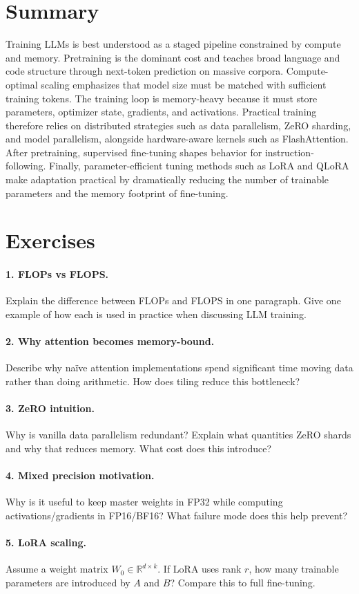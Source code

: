 \section{Summary}
Training LLMs is best understood as a staged pipeline constrained by compute and memory. Pretraining is the dominant cost and teaches broad language and code structure through next-token prediction on massive corpora. Compute-optimal scaling emphasizes that model size must be matched with sufficient training tokens. The training loop is memory-heavy because it must store parameters, optimizer state, gradients, and activations. Practical training therefore relies on distributed strategies such as data parallelism, ZeRO sharding, and model parallelism, alongside hardware-aware kernels such as FlashAttention. After pretraining, supervised fine-tuning shapes behavior for instruction-following. Finally, parameter-efficient tuning methods such as LoRA and QLoRA make adaptation practical by dramatically reducing the number of trainable parameters and the memory footprint of fine-tuning.

\section{Exercises}
\paragraph{1. FLOPs vs FLOPS.}
Explain the difference between FLOPs and FLOPS in one paragraph. Give one example of how each is used in practice when discussing LLM training.

\paragraph{2. Why attention becomes memory-bound.}
Describe why naïve attention implementations spend significant time moving data rather than doing arithmetic. How does tiling reduce this bottleneck?

\paragraph{3. ZeRO intuition.}
Why is vanilla data parallelism redundant? Explain what quantities ZeRO shards and why that reduces memory. What cost does this introduce?

\paragraph{4. Mixed precision motivation.}
Why is it useful to keep master weights in FP32 while computing activations/gradients in FP16/BF16? What failure mode does this help prevent?

\paragraph{5. LoRA scaling.}
Assume a weight matrix \(W_0 \in \mathbb{R}^{d\times k}\). If LoRA uses rank \(r\), how many trainable parameters are introduced by \(A\) and \(B\)? Compare this to full fine-tuning.
